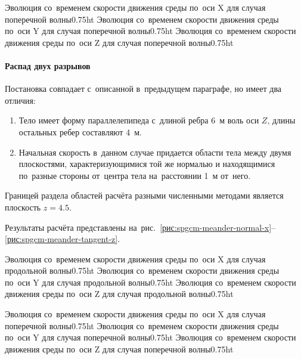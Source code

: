 \documentclass[thesis.tex]{subfiles}
\begin{document}
          {Эволюция со~временем скорости движения среды по~оси X для случая поперечной волны}{0.75\linewidth}{ht}
          {Эволюция со~временем скорости движения среды по~оси Y для случая поперечной волны}{0.75\linewidth}{ht}
          {Эволюция со~временем скорости движения среды по~оси Z для случая поперечной волны}{0.75\linewidth}{ht}

\paragraph{Распад двух разрывов}
Постановка совпадает с~описанной в~предыдущем параграфе, но имеет два отличия:
\begin{enumerate}
    \item Тело имеет форму параллелепипеда с~длиной ребра 6~м воль оси $Z$, длины остальных ребер составляют 4~м.
    \item Начальная скорость в~данном случае придается области тела между двумя плоскостями, характеризующимися той же
    нормалью и находящимися по~разные стороны от~центра тела на~расстоянии 1~м от~него.
\end{enumerate}

Границей раздела областей расчёта разными численными методами является плоскость $z=4.5$.

Результаты расчёта представлены на~рис.~\ref {рис:spgcm-meander-normal-x}--\ref {рис:spgcm-meander-tangent-z}.

          {Эволюция со~временем скорости движения среды по~оси X для случая продольной волны}{0.75\linewidth}{ht}
          {Эволюция со~временем скорости движения среды по~оси Y для случая продольной волны}{0.75\linewidth}{ht}
          {Эволюция со~временем скорости движения среды по~оси Z для случая продольной волны}{0.75\linewidth}{ht}

          {Эволюция со~временем скорости движения среды по~оси X для случая поперечной волны}{0.75\linewidth}{ht}
          {Эволюция со~временем скорости движения среды по~оси Y для случая поперечной волны}{0.75\linewidth}{ht}
          {Эволюция со~временем скорости движения среды по~оси Z для случая поперечной волны}{0.75\linewidth}{ht}
\end{document}
